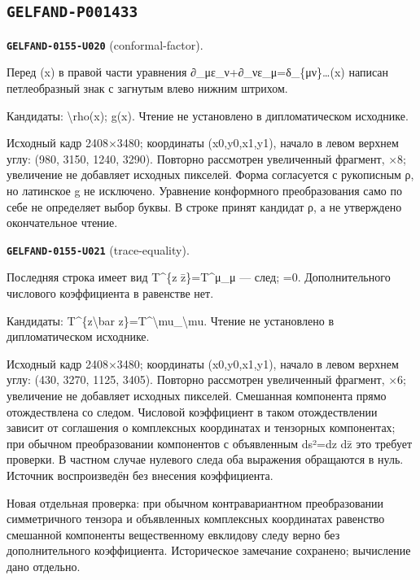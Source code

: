 \subsection*{\texttt{GELFAND-P001433}}
\par\noindent\leavevmode{}\label{GELFAND-0155-U020}\label{GELFAND-P001433:conformal-factor}\textbf{\texttt{GELFAND-0155-U020}} (conformal-factor).\nopagebreak[4]\par
Перед (x) в правой части уравнения ∂\_με\_ν+∂\_νε\_μ=δ\_\{μν\}…(x) написан петлеобразный знак с загнутым влево нижним штрихом.\par
Кандидаты: \textbackslash{}rho(x); g(x). Чтение не установлено в дипломатическом исходнике.\par
Исходный кадр 2408×3480; координаты (x0,y0,x1,y1), начало в левом верхнем углу: (980, 3150, 1240, 3290). Повторно рассмотрен увеличенный фрагмент, ×8; увеличение не добавляет исходных пикселей. Форма согласуется с рукописным ρ, но латинское g не исключено. Уравнение конформного преобразования само по себе не определяет выбор буквы. В строке принят кандидат ρ, а не утверждено окончательное чтение.\par
\medskip
\par\noindent\leavevmode{}\label{GELFAND-0155-U021}\label{GELFAND-P001433:trace-equality}\textbf{\texttt{GELFAND-0155-U021}} (trace-equality).\nopagebreak[4]\par
Последняя строка имеет вид T\textasciicircum{}\{z z̄\}=T\textasciicircum{}μ\_μ — след; =0. Дополнительного числового коэффициента в равенстве нет.\par
Кандидаты: T\textasciicircum{}\{z\textbackslash{}bar z\}=T\textasciicircum{}\textbackslash{}mu\_\textbackslash{}mu. Чтение не установлено в дипломатическом исходнике.\par
Исходный кадр 2408×3480; координаты (x0,y0,x1,y1), начало в левом верхнем углу: (430, 3270, 1125, 3405). Повторно рассмотрен увеличенный фрагмент, ×6; увеличение не добавляет исходных пикселей. Смешанная компонента прямо отождествлена со следом. Числовой коэффициент в таком отождествлении зависит от соглашения о комплексных координатах и тензорных компонентах; при обычном преобразовании компонентов с объявленным ds²=dz dz̄ это требует проверки. В частном случае нулевого следа оба выражения обращаются в нуль. Источник воспроизведён без внесения коэффициента.\par
Новая отдельная проверка: при обычном контравариантном преобразовании симметричного тензора и объявленных комплексных координатах равенство смешанной компоненты вещественному евклидову следу верно без дополнительного коэффициента. Историческое замечание сохранено; вычисление дано отдельно.\par
\medskip
